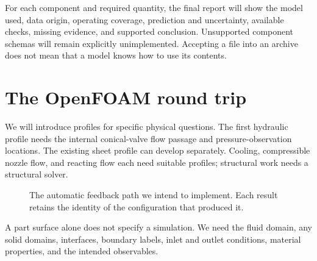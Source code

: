 For each component and required quantity, the final report will show the model used, data origin, operating coverage, prediction and uncertainty, available checks, missing evidence, and supported conclusion. Unsupported component schemas will remain explicitly unimplemented. Accepting a file into an archive does not mean that a model knows how to use its contents.

\section{The OpenFOAM round trip}

We will introduce profiles for specific physical questions. The first hydraulic profile needs the internal conical-valve flow passage and pressure-observation locations. The existing sheet profile can develop separately. Cooling, compressible nozzle flow, and reacting flow each need suitable profiles; structural work needs a structural solver.

\begin{figure}[htbp]
\centering
{}
\caption{The automatic feedback path we intend to implement. Each result retains the identity of the configuration that produced it.}
\end{figure}

A part surface alone does not specify a simulation. We need the fluid domain, any solid domains, interfaces, boundary labels, inlet and outlet conditions, material properties, and the intended observables.

